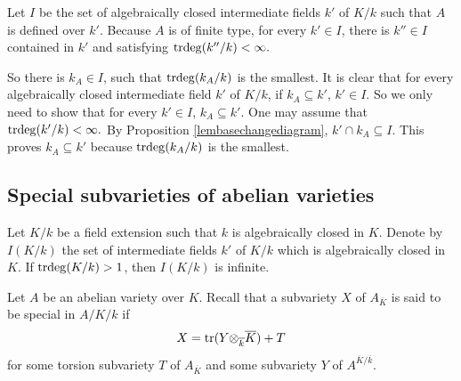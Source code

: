 \documentclass[12pt]{amsart}
\begin{document}
Let $I$ be the set of algebraically closed intermediate fields $k'$ of  $K/k$ such that $A$  is defined over  $k'$.
Because $A$ is of finite type, for every $k'\in I$, there is $k''\in I$ contained in $k'$ and satisfying ${\mathrm{trdeg}}(k''/k)<\infty.$

So there is $k_A\in I$, such that ${\mathrm{trdeg}}(k_A/k)$ is the smallest. 
It is clear that for every algebraically closed intermediate field $k'$ of $K/k$, if $k_A\subseteq k'$, $k'\in I.$
So we only need to show that  for every $k'\in I$, $k_A\subseteq k'.$ One may assume that ${\mathrm{trdeg}}(k'/k)<\infty.$
By Proposition \ref{lembasechangediagram}, $k'\cap k_A\subseteq I.$
This proves $k_A\subseteq k'$ because ${\mathrm{trdeg}}(k_A/k)$ is the smallest.
\endproof

\subsection{Special subvarieties of abelian varieties}\label{subsectionnonspecial}

%

Let $K/k$ be a field extension such that $k$ is algebraically closed in $K$. 
Denote by $I(K/k)$ the set of intermediate fields $k'$ of $K/k$ which is algebraically closed in $K.$
If ${\mathrm{trdeg}}(K/k)>1$, then  $I(K/k)$ is infinite. 


Let $A$ be an abelian variety over $K$.   Recall that 
a subvariety $X$ of $A_{\overline{K}}$ is said to be special in $A/K/k$ if  
\begin{equation}
X={\rm tr}(Y{\otimes_{\overline{k}}\overline{K}})+T
\end{equation}
for some torsion subvariety $T$ of $A_{\overline{K}}$ and  some subvariety $Y$ of $A^{\overline{K}/\overline{k}}$.
\end{document}
